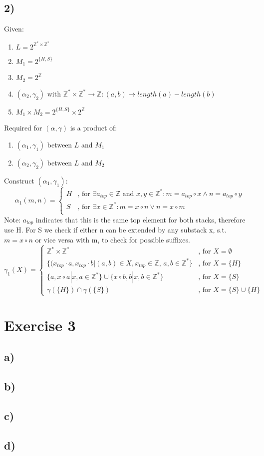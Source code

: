 \documentclass[fleqn,12pt]{article}
\begin{document}
\subsection*{2)}
Given:
\begin{enumerate}
	\item $L = 2^{\mathbb{Z^{*}} \times \mathbb{Z^{*}}}$
	\item $M_1 = 2^{\{H,S\}}$
	\item $M_2 = 2^{\mathbb{Z}}$
	\item $(\alpha_2,\gamma_2) \text{ with } \mathbb{Z}^* \times \mathbb{Z}^* \rightarrow \mathbb{Z}:(a,b)\mapsto length(a) - length(b)$
	\item $M_1 \times M_2 = 2^{\{H,S\}} \times 2^{\mathbb{Z}}$
\end{enumerate}
Required for $(\alpha,\gamma)$ is a product of:
	\begin{enumerate}
		\item $(\alpha_1,\gamma_1)$ between $L$ and $M_1$
		\item $(\alpha_2,\gamma_2)$ between $L$ and $M_2$
	\end{enumerate}
Construct $(\alpha_1,\gamma_1)$:
  \[
    \alpha_1(m,n) =
    \begin{cases}
         H & \text{, for } \exists a_{top}  \in \mathbb{Z} \text{ and }x,y\in \mathbb{Z}^*: m = a_{top} \circ x \land n = a_{top} \circ y \\
         S & \text{, for } \exists x  \in \mathbb{Z}^*: m = x \circ n \lor n = x \circ m \\
    \end{cases}
  \]
  Note: $a_{top}$ indicates that this is the same top element for both stacks, therefore use H. For S we check if either n can be extended by any substack x, s.t. $m=x \circ n$ or vice versa with m, to check for possible suffixes.
    \[
    \gamma_1(X) =
    \begin{cases}
        \mathbb{Z}^* \times \mathbb{Z}^* & \text{, for } X=\emptyset\\
        \{(x_{top} \cdot a, x_{top} \cdot b | (a,b)\in X ,x_{top} \in \mathbb{Z}\text{, } a,b \in \mathbb{Z}^*\} & \text{, for } X=\{H\} \\
        \{a,x \circ a | x,a \in \mathbb{Z}^*\} \cup \{x \circ b,b|x,b \in \mathbb{Z}^*\} & \text{, for } X=\{S\}\\
        \gamma(\{H\}) \cap \gamma(\{S\}) & \text{, for } X=\{S\}\cup\{H\}
    \end{cases}
  \]  
\section*{Exercise 3}
\subsection*{a)}

\subsection*{b)}

\subsection*{c)}

\subsection*{d)}
\end{document}
